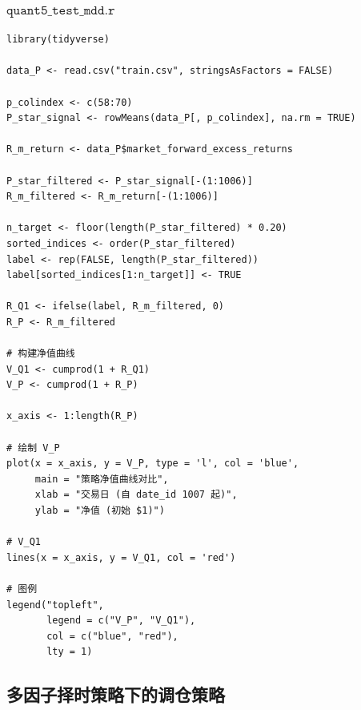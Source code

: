\documentclass[11pt, a4paper]{article}
\begin{document}
\subsubsection{$\texttt{quant5\_test\_mdd.r}$}
\begin{verbatim}
library(tidyverse)

data_P <- read.csv("train.csv", stringsAsFactors = FALSE)

p_colindex <- c(58:70)
P_star_signal <- rowMeans(data_P[, p_colindex], na.rm = TRUE)

R_m_return <- data_P$market_forward_excess_returns

P_star_filtered <- P_star_signal[-(1:1006)]
R_m_filtered <- R_m_return[-(1:1006)]

n_target <- floor(length(P_star_filtered) * 0.20)
sorted_indices <- order(P_star_filtered)
label <- rep(FALSE, length(P_star_filtered))
label[sorted_indices[1:n_target]] <- TRUE

R_Q1 <- ifelse(label, R_m_filtered, 0)
R_P <- R_m_filtered

# 构建净值曲线
V_Q1 <- cumprod(1 + R_Q1)
V_P <- cumprod(1 + R_P)

x_axis <- 1:length(R_P)

# 绘制 V_P
plot(x = x_axis, y = V_P, type = 'l', col = 'blue', 
     main = "策略净值曲线对比",
     xlab = "交易日 (自 date_id 1007 起)", 
     ylab = "净值 (初始 $1)")

# V_Q1
lines(x = x_axis, y = V_Q1, col = 'red')

# 图例
legend("topleft", 
       legend = c("V_P", "V_Q1"), 
       col = c("blue", "red"), 
       lty = 1)    
\end{verbatim}
\subsection{多因子择时策略下的调仓策略}
\end{document}
